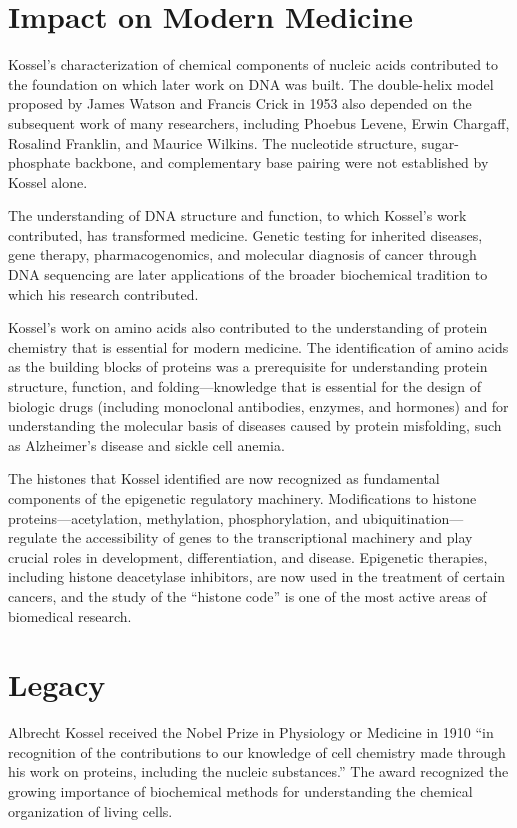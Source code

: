 \section{Impact on Modern Medicine}

Kossel's characterization of chemical components of nucleic acids contributed to the foundation on which later work on DNA was built. The double-helix model proposed by James Watson and Francis Crick in 1953 also depended on the subsequent work of many researchers, including Phoebus Levene, Erwin Chargaff, Rosalind Franklin, and Maurice Wilkins. The nucleotide structure, sugar-phosphate backbone, and complementary base pairing were not established by Kossel alone.\cite{kossel-history}

The understanding of DNA structure and function, to which Kossel's work contributed, has transformed medicine. Genetic testing for inherited diseases, gene therapy, pharmacogenomics, and molecular diagnosis of cancer through DNA sequencing are later applications of the broader biochemical tradition to which his research contributed.

Kossel's work on amino acids also contributed to the understanding of protein chemistry that is essential for modern medicine. The identification of amino acids as the building blocks of proteins was a prerequisite for understanding protein structure, function, and folding---knowledge that is essential for the design of biologic drugs (including monoclonal antibodies, enzymes, and hormones) and for understanding the molecular basis of diseases caused by protein misfolding, such as Alzheimer's disease and sickle cell anemia.

The histones that Kossel identified are now recognized as fundamental components of the epigenetic regulatory machinery. Modifications to histone proteins---acetylation, methylation, phosphorylation, and ubiquitination---regulate the accessibility of genes to the transcriptional machinery and play crucial roles in development, differentiation, and disease. Epigenetic therapies, including histone deacetylase inhibitors, are now used in the treatment of certain cancers, and the study of the ``histone code'' is one of the most active areas of biomedical research.

\section{Legacy}

Albrecht Kossel received the Nobel Prize in Physiology or Medicine in 1910 ``in recognition of the contributions to our knowledge of cell chemistry made through his work on proteins, including the nucleic substances.'' The award recognized the growing importance of biochemical methods for understanding the chemical organization of living cells.

